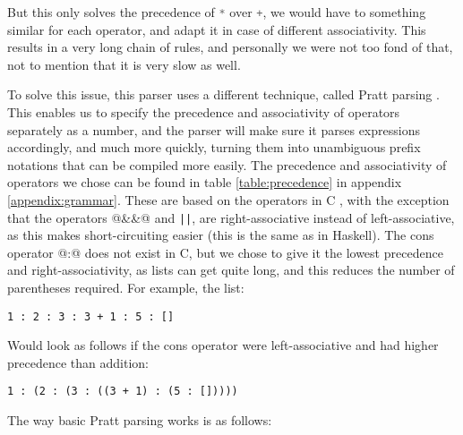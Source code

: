 But this only solves the precedence of \lstinline[language=rust]|*| over \lstinline[language=rust]|+|, we would have to something similar for each operator, and adapt it in case of different associativity. This results in a very long chain of rules, and personally we were not too fond of that, not to mention that it is very slow as well.

To solve this issue, this parser uses a different technique, called Pratt parsing \cite{kladov_2020}. This enables us to specify the precedence and associativity of operators separately as a number, and the parser will make sure it parses expressions accordingly, and much more quickly, turning them into unambiguous prefix notations that can be compiled more easily. The precedence and associativity of operators we chose can be found in table \ref{table:precedence} in appendix \ref{appendix:grammar}. These are based on the operators in C \cite{precedence}, with the exception that the operators @&&@ and \lstinline{||}, are right-associative instead of left-associative, as this makes short-circuiting easier (this is the same as in Haskell). The cons operator @:@ does not exist in C, but we chose to give it the lowest precedence and right-associativity, as lists can get quite long, and this reduces the number of parentheses required. For example, the list:

\begin{lstlisting}[language=spl]
1 : 2 : 3 : 3 + 1 : 5 : []
\end{lstlisting}

Would look as follows if the cons operator were left-associative and had higher precedence than addition:

\begin{lstlisting}[language=spl]
1 : (2 : (3 : ((3 + 1) : (5 : []))))
\end{lstlisting}

The way basic Pratt parsing works is as follows:

